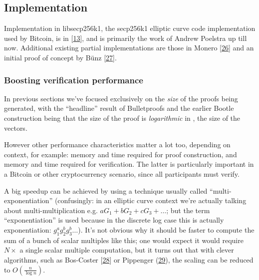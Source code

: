 \documentclass[10pt,a4paper]{article}
\begin{document}
\hypertarget{implementation}{%
\subsection[Implementation]{\texorpdfstring{\protect\hypertarget{anchor-70}{}{}Implementation}{Implementation}}\label{implementation}}

Implementation in libsecp256k1, the secp256k1 elliptic curve code
implementation used by Bitcoin, is in
{[}\protect\hyperlink{anchor-71}{13}{]}, and is primarily the work of
Andrew Poelstra up till now. Additional existing partial implementations
are those in Monero {[}\protect\hyperlink{anchor-72}{26}{]} and an
initial proof of concept by Bünz
{[}\protect\hyperlink{anchor-73}{27}{]}.

\hypertarget{boosting-verification-performance}{%
\subsubsection[Boosting verification
performance]{\texorpdfstring{\protect\hypertarget{anchor-74}{}{}Boosting
verification
performance}{Boosting verification performance}}\label{boosting-verification-performance}}

In previous sections we've focused exclusively on the \emph{size} of the
proofs being generated, with the ``headline'' result of Bulletproofs and
the earlier Bootle construction being that the size of the proof is
\emph{logarithmic }in , the size of the vectors.

However other performance characteristics matter a lot too, depending on
context, for example: memory and time required for proof construction,
and memory and time required for verification. The latter is
particularly important in a Bitcoin or other cryptocurrency scenario,
since all participants must verify.

A big speedup can be achieved by using a technique usually called
``multi-exponentiation'' (confusingly: in an elliptic curve context
we're actually talking about multi-multiplication e.g. $aG_1 + bG_2 + cG_3 + \ldots$; but the term
``exponentiation'' is used because in the discrete log case this is
actually exponentiation: $g_1^ag_2^bg_3^b \ldots$). It's not obvious why it should be faster to
compute the sum of a bunch of scalar multiples like this; one would
expect it would require $N \times$ a single scalar multiple computation, but it
turns out that with clever algorithms, such as Bos-Coster
{[}\protect\hyperlink{anchor-75}{28}{]} or Pippenger
(\protect\hyperlink{anchor-76}{29}), the scaling can be reduced to $O(\frac{n}{\log n})$.
\end{document}
